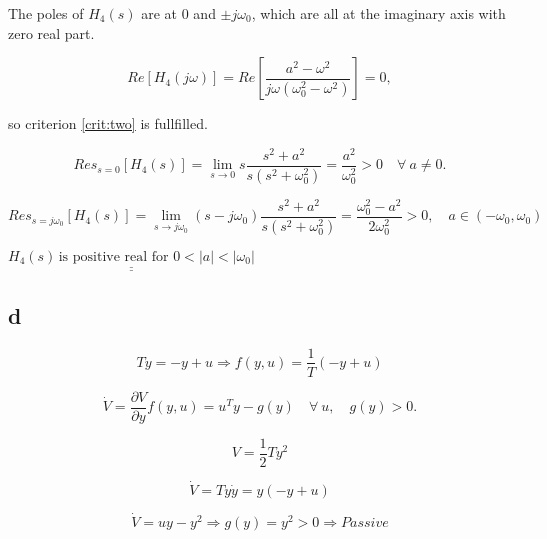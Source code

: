 \documentclass{article}
\begin{document}
The poles of $H_4(s)$ are at $0$ and $\pm j\omega_0$, which are all at the imaginary axis with zero real part. 

\begin{equation*}
    Re[H_4(j\omega)] = Re[\frac{a^2 - \omega^2}{j\omega(\omega_0^2 - \omega^2)}] = 0,
\end{equation*}

so criterion \ref{crit:two} is fullfilled. 

\begin{equation*}
    Res_{s = 0}[H_4(s)] = \lim_{s \to 0} s \frac{s^2 + a^2}{s(s^2 + \omega_0^2)} = \frac{a^2}{\omega_0^2} > 0 \quad \forall \: a \neq 0.
\end{equation*}

\begin{equation*}
    Res_{s = j\omega_0}[H_4(s)] = \lim_{s \to j\omega_0} (s-j\omega_0) \frac{s^2 + a^2}{s(s^2 + \omega_0^2)} = \frac{\omega_0^2 - a^2}{2\omega_0^2} > 0, \quad a \in (-\omega_0,\omega_0)
\end{equation*}

$\underline{\underline{H_4(s) \, \textrm{is positive real for } 0 < |a| < |\omega_0|}}$

\subsection*{d}

\begin{equation*}
    T\dot y = -y + u \Rightarrow f(y,u) = \frac{1}{T}(-y + u)
\end{equation*}

\begin{equation*}
    \dot V = \frac{\partial V}{\partial y}f(y,u) = u^Ty - g(y) \quad \forall \: u, \quad g(y) > 0.
\end{equation*}

\begin{equation*}
    V = \frac{1}{2}Ty^2
\end{equation*}

\begin{equation*}
    \dot V = Ty\dot y = y(-y + u)
\end{equation*}


\begin{equation*}
    \dot V = uy - y^2 \Rightarrow g(y) = y^2 > 0 \Rightarrow Passive
\end{equation*}
\end{document}
